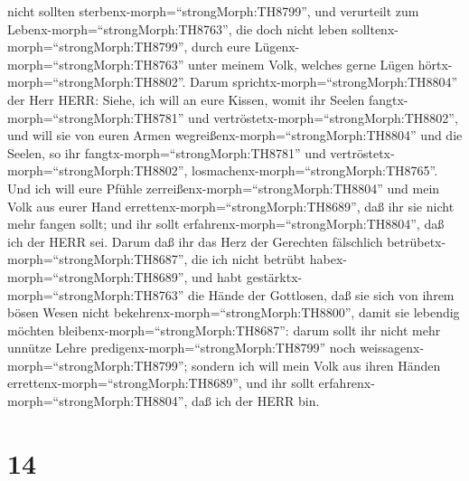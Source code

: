 nicht sollten sterbenx-morph=``strongMorph:TH8799'', und verurteilt zum
Lebenx-morph=``strongMorph:TH8763'', die doch nicht leben
solltenx-morph=``strongMorph:TH8799'', durch eure
Lügenx-morph=``strongMorph:TH8763'' unter meinem Volk, welches gerne
Lügen hörtx-morph=``strongMorph:TH8802''.  Darum
sprichtx-morph=``strongMorph:TH8804'' der Herr HERR: Siehe, ich will an
eure Kissen, womit ihr Seelen fangtx-morph=``strongMorph:TH8781'' und
vertröstetx-morph=``strongMorph:TH8802'', und will sie von euren Armen
wegreißenx-morph=``strongMorph:TH8804'' und die Seelen, so ihr
fangtx-morph=``strongMorph:TH8781'' und
vertröstetx-morph=``strongMorph:TH8802'',
losmachenx-morph=``strongMorph:TH8765''.  Und ich will eure
Pfühle zerreißenx-morph=``strongMorph:TH8804'' und mein Volk aus eurer
Hand errettenx-morph=``strongMorph:TH8689'', daß ihr sie nicht mehr
fangen sollt; und ihr sollt erfahrenx-morph=``strongMorph:TH8804'', daß
ich der HERR sei.  Darum daß ihr das Herz der Gerechten
fälschlich betrübetx-morph=``strongMorph:TH8687'', die ich nicht betrübt
habex-morph=``strongMorph:TH8689'', und habt
gestärktx-morph=``strongMorph:TH8763'' die Hände der Gottlosen, daß sie
sich von ihrem bösen Wesen nicht bekehrenx-morph=``strongMorph:TH8800'',
damit sie lebendig möchten bleibenx-morph=``strongMorph:TH8687'':
 darum sollt ihr nicht mehr unnütze Lehre
predigenx-morph=``strongMorph:TH8799'' noch
weissagenx-morph=``strongMorph:TH8799''; sondern ich will mein Volk aus
ihren Händen errettenx-morph=``strongMorph:TH8689'', und ihr sollt
erfahrenx-morph=``strongMorph:TH8804'', daß ich der HERR bin.

\hypertarget{section-13}{%
\section{14}\label{section-13}}

